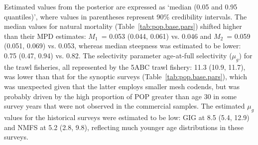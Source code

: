 \documentclass[11pt]{book}
\newcommand{\pc}{\%}
\begin{document}
Estimated values from the posterior are expressed as `median (0.05 and 0.95 quantiles)', where values in parentheses represent 90\pc{} credibility intervals.
The median values for natural mortality (Table~\ref{tab:pop.base.pars}) shifted higher than their MPD estimates: $M_1$~= 0.053 (0.044, 0.061) vs. 0.046 and $M_2$~= 0.059 (0.051, 0.069) vs. 0.053, whereas median steepness was estimated to be lower: 0.75 (0.47, 0.94) vs. 0.82.
The selectivity parameter age-at-full selectivity ($\mu_g$) for the trawl fisheries, all represented by the 5ABC trawl fishery: 11.3 (10.9, 11.7), was lower than that for the synoptic surveys (Table~\ref{tab:pop.base.pars}), which was unexpected given that the latter employs smaller mesh codends, but was probably driven by the high proportion of POP greater than age 30 in some survey years that were not observed in the commercial samples. 
The estimated $\mu_g$ values for the historical surveys were estimated to be low: GIG at 8.5 (5.4, 12.9) and NMFS at 5.2 (2.8, 9.8), reflecting much younger age distributions in these surveys. 

\end{document}
